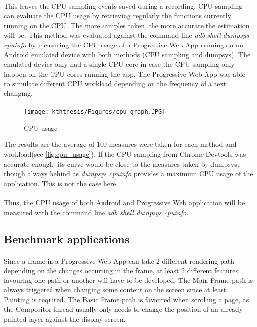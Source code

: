 \paragraph{}
This leaves the CPU sampling events saved during a recording. CPU sampling \cite{cpu_sampling} can evaluate the CPU usage by retrieving regularly the functions currently running on the CPU. The more samples taken, the more accurate the estimation will be. This method was evaluated against the command line \textit{adb shell dumpsys cpuinfo} by measuring the CPU usage of a  Progressive Web App running on an Android emulated device with both methods (CPU sampling and dumpsys).
\color{blue}
The emulated device only had a single CPU core in case the CPU sampling only happen on the CPU cores running the app. The Progressive Web App was able to simulate different CPU workload depending on the frequency of a text changing.
\paragraph{}

\begin{figure}
    \centering
    \texttt{[image: kththesis/Figures/cpu\_graph.JPG]}
    \caption{CPU usage}
    \label{fig:cpu_usage}
\end{figure}

The results are the average of 100 measures were taken for each method and workload(see \autoref{fig:cpu_usage}). If the CPU sampling from Chrome Devtools was accurate enough, its curve would be close to the measures taken by dumpsys, though always behind as \textit{dumpsys cpuinfo} provides a maximum CPU usage of the application. This is not the case here.

\paragraph{}
Thus, the CPU usage of both Android and Progressive Web application will be measured with the command line \textit{adb shell dumpsys cpuinfo}.

\color{black}
    


\subsection{Benchmark applications}
\paragraph{}
Since a frame in a Progressive Web App can take 2 different rendering path depending on the changes occurring in the frame, at least 2 different features favouring one path or another will have to be developed. The Main Frame path is always triggered when changing some content on the screen since at least Painting is required. The Basic Frame path is favoured when scrolling a page, as the Compositor thread usually only needs to change the position of an already-painted layer against the display screen. 

